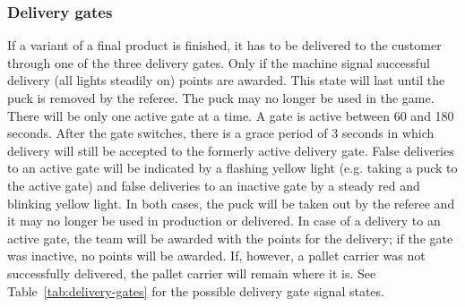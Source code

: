 \documentclass[12pt,twoside]{article}
\begin{document}
\subsubsection{Delivery gates} 
\label{sec:delivery-gates}
If a variant of a final product is finished, it has to be delivered to
the customer through one of the three delivery gates.  Only if the
machine signal successful delivery (all lights steadily on) points are
awarded. This state will last until the puck is removed by the
referee. The puck may no longer be used in the game.  There will be
only one active gate at a time. A gate is active between 60 and 180
seconds. After the gate switches, there is a grace period of 3 seconds
in which delivery will still be accepted to the formerly active
delivery gate. False deliveries to an active gate will be indicated by
a flashing yellow light (e.g. taking a  puck to the active
gate) and false deliveries to an inactive gate by a steady red and
blinking yellow light. In both cases, the puck will be taken out by the referee and
it may no longer be used in production or delivered. In case of a
delivery to an active gate, the team will be awarded with the points
for the delivery; if the gate was inactive, no points will be
awarded. If, however, a pallet carrier was not successfully delivered,
the pallet carrier will remain where it is. See
Table~\ref{tab:delivery-gates} for the possible delivery gate signal
states.
\end{document}
